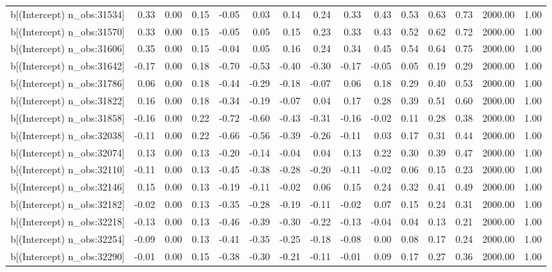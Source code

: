 \begin{table}[ht]
\begin{tabular}{rrrrrrrrrrrrrrr}
  b[(Intercept) n\_obs:31534] & 0.33 & 0.00 & 0.15 & -0.05 & 0.03 & 0.14 & 0.24 & 0.33 & 0.43 & 0.53 & 0.63 & 0.73 & 2000.00 & 1.00 \\ 
  b[(Intercept) n\_obs:31570] & 0.33 & 0.00 & 0.15 & -0.05 & 0.05 & 0.15 & 0.23 & 0.33 & 0.43 & 0.52 & 0.62 & 0.72 & 2000.00 & 1.00 \\ 
  b[(Intercept) n\_obs:31606] & 0.35 & 0.00 & 0.15 & -0.04 & 0.05 & 0.16 & 0.24 & 0.34 & 0.45 & 0.54 & 0.64 & 0.75 & 2000.00 & 1.00 \\ 
  b[(Intercept) n\_obs:31642] & -0.17 & 0.00 & 0.18 & -0.70 & -0.53 & -0.40 & -0.30 & -0.17 & -0.05 & 0.05 & 0.19 & 0.29 & 2000.00 & 1.00 \\ 
  b[(Intercept) n\_obs:31786] & 0.06 & 0.00 & 0.18 & -0.44 & -0.29 & -0.18 & -0.07 & 0.06 & 0.18 & 0.29 & 0.40 & 0.53 & 2000.00 & 1.00 \\ 
  b[(Intercept) n\_obs:31822] & 0.16 & 0.00 & 0.18 & -0.34 & -0.19 & -0.07 & 0.04 & 0.17 & 0.28 & 0.39 & 0.51 & 0.60 & 2000.00 & 1.00 \\ 
  b[(Intercept) n\_obs:31858] & -0.16 & 0.00 & 0.22 & -0.72 & -0.60 & -0.43 & -0.31 & -0.16 & -0.02 & 0.11 & 0.28 & 0.38 & 2000.00 & 1.00 \\ 
  b[(Intercept) n\_obs:32038] & -0.11 & 0.00 & 0.22 & -0.66 & -0.56 & -0.39 & -0.26 & -0.11 & 0.03 & 0.17 & 0.31 & 0.44 & 2000.00 & 1.00 \\ 
  b[(Intercept) n\_obs:32074] & 0.13 & 0.00 & 0.13 & -0.20 & -0.14 & -0.04 & 0.04 & 0.13 & 0.22 & 0.30 & 0.39 & 0.47 & 2000.00 & 1.00 \\ 
  b[(Intercept) n\_obs:32110] & -0.11 & 0.00 & 0.13 & -0.45 & -0.38 & -0.28 & -0.20 & -0.11 & -0.02 & 0.06 & 0.15 & 0.23 & 2000.00 & 1.00 \\ 
  b[(Intercept) n\_obs:32146] & 0.15 & 0.00 & 0.13 & -0.19 & -0.11 & -0.02 & 0.06 & 0.15 & 0.24 & 0.32 & 0.41 & 0.49 & 2000.00 & 1.00 \\ 
  b[(Intercept) n\_obs:32182] & -0.02 & 0.00 & 0.13 & -0.35 & -0.28 & -0.19 & -0.11 & -0.02 & 0.07 & 0.15 & 0.24 & 0.31 & 2000.00 & 1.00 \\ 
  b[(Intercept) n\_obs:32218] & -0.13 & 0.00 & 0.13 & -0.46 & -0.39 & -0.30 & -0.22 & -0.13 & -0.04 & 0.04 & 0.13 & 0.21 & 2000.00 & 1.00 \\ 
  b[(Intercept) n\_obs:32254] & -0.09 & 0.00 & 0.13 & -0.41 & -0.35 & -0.25 & -0.18 & -0.08 & 0.00 & 0.08 & 0.17 & 0.24 & 2000.00 & 1.00 \\ 
  b[(Intercept) n\_obs:32290] & -0.01 & 0.00 & 0.15 & -0.38 & -0.30 & -0.21 & -0.11 & -0.01 & 0.09 & 0.17 & 0.27 & 0.36 & 2000.00 & 1.00 \\ 

\end{tabular}
\end{table}
